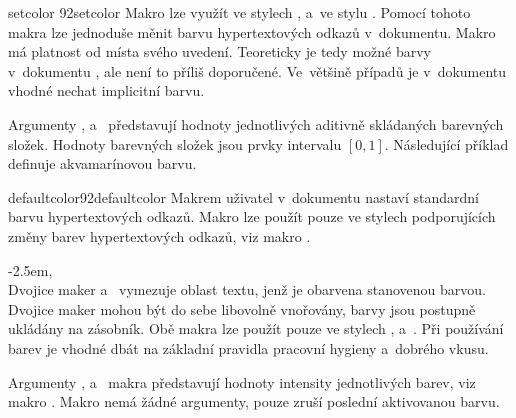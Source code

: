 \documentclass[12pt]{article}
\begin{document}
\medskip
\begin{makro}{setcolor}
  {\char92setcolor%
    }
  Makro  lze využít ve stylech , 
  a~ve stylu . Pomocí tohoto makra lze jednoduše měnit barvu
  hypertextových odkazů v~dokumentu. Makro má platnost od místa svého uvedení.
  Teoreticky je tedy možné barvy v~dokumentu , ale není to příliš
  doporučené. Ve~většině případů je v~dokumentu vhodné nechat implicitní barvu.

  \smallskip
  Argumenty ,  a~ představují hodnoty 
  jednotlivých aditivně skládaných barevných složek. Hodnoty barevných složek
  jsou prvky intervalu \mbox{$\left[0,1\right]$}.
  Následující příklad definuje 
  akvamarínovou\ehilight{} barvu.

  \begin{example}
  \end{example}
\end{makro}

\medskip
\begin{makro}{defaultcolor}{\char92defaultcolor}
  Makrem  uživatel v~dokumentu nastaví standardní barvu
  hypertextových odkazů. Makro lze použít pouze ve stylech podporujících
  změny barev hypertextových odkazů, viz makro .
\end{makro}

\medskip\bgroup
\noindent%
%
\addtolength{\leftskip}{2.5em}\parindent=0pt
\null \kern-2.5em,
 \\[2pt]
Dvojice maker  a~ vymezuje oblast textu, jenž
je obarvena stanovenou barvou. Dvojice maker mohou být do sebe libovolně
vnořovány, barvy jsou postupně ukládány na zásobník. Obě makra lze použít
pouze ve stylech ,  a~. Při používání
barev je vhodné dbát na základní pravidla pracovní hygieny a~dobrého vkusu.

\smallskip
  Argumenty ,  a~ makra  
  představují hodnoty intensity jednotlivých barev, viz makro .
  Makro  nemá žádné argumenty, pouze zruší poslední aktivovanou
  barvu.
  
\end{document}
